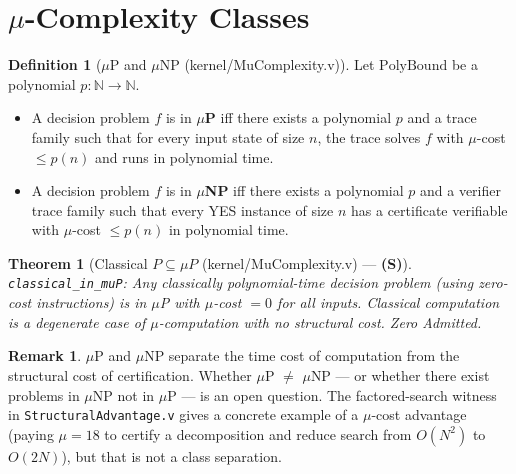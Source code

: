 \documentclass[11pt, a4paper]{report}
\theoremstyle{definition}
\newtheorem{definition}{Definition}[chapter]
\newtheorem{remark}{Remark}[chapter]
\theoremstyle{plain}
\newtheorem{theorem}{Theorem}[chapter]
\newcommand{\N}{\mathbb{N}}
\begin{document}
\section{$\mu$-Complexity Classes}

\begin{definition}[$\mu$P and $\mu$NP {\normalfont (kernel/MuComplexity.v)}]
Let $\mathrm{PolyBound}$ be a polynomial $p : \N \to \N$.
\begin{itemize}
    \item A decision problem $f$ is in \textbf{$\mu$P} iff there exists a polynomial $p$ and a trace family such that for every input state of size $n$, the trace solves $f$ with $\mu$-cost $\le p(n)$ and runs in polynomial time.
    \item A decision problem $f$ is in \textbf{$\mu$NP} iff there exists a polynomial $p$ and a verifier trace family such that every YES instance of size $n$ has a certificate verifiable with $\mu$-cost $\le p(n)$ in polynomial time.
\end{itemize}
\end{definition}

\begin{theorem}[Classical $P \subseteq \mu P$ {\normalfont (kernel/MuComplexity.v)} --- \textbf{(S)}]
\texttt{classical\_in\_muP}: Any classically polynomial-time decision problem (using zero-cost instructions) is in $\mu$P with $\mu$-cost $= 0$ for all inputs. Classical computation is a degenerate case of $\mu$-computation with no structural cost. Zero Admitted.
\end{theorem}

\begin{remark}
$\mu$P and $\mu$NP separate the time cost of computation from the structural cost of certification. Whether $\mu$P $\neq$ $\mu$NP — or whether there exist problems in $\mu$NP not in $\mu$P — is an open question. The factored-search witness in \texttt{StructuralAdvantage.v} gives a concrete example of a $\mu$-cost advantage (paying $\mu = 18$ to certify a decomposition and reduce search from $O(N^2)$ to $O(2N)$), but that is not a class separation.
\end{remark}
\end{document}
